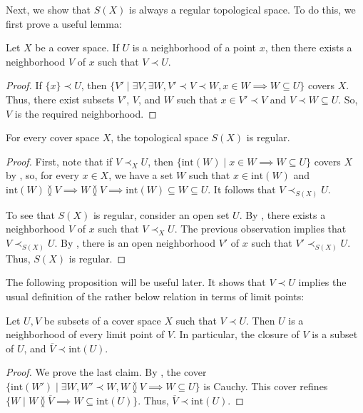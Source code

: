 \documentclass[reqno]{amsart}
\theoremstyle{definition}
\theoremstyle{remark}
\numberwithin{figure}{section}
\newcommand{\overlap}[2]{#1 \between #2}
\newcommand{\rb}{\prec}
\begin{document}
Next, we show that $S(X)$ is always a regular topological space.
To do this, we first prove a useful lemma:

\begin{lem}[rb-point]
Let $X$ be a cover space.
If $U$ is a neighborhood of a point $x$, then there exists a neighborhood $V$ of $x$ such that $V \rb U$.
\end{lem}
\begin{proof}
If $\{ x \} \rb U$, then $\{ V' \mid \exists V, \exists W, V' \rb V \rb W, x \in W \implies W \subseteq U \}$ covers $X$.
Thus, there exist subsets $V'$, $V$, and $W$ such that $x \in V' \rb V$ and $V \rb W \subseteq U$.
So, $V$ is the required neighborhood.
\end{proof}

\begin{prop}
For every cover space $X$, the topological space $S(X)$ is regular.
\end{prop}
\begin{proof}
First, note that if $V \rb_X U$, then $\{ \mathrm{int}(W) \mid x \in W \implies W \subseteq U \}$ covers $X$ by ,
so, for every $x \in X$, we have a set $W$ such that $x \in \mathrm{int}(W)$ and $\overlap{\mathrm{int}(W)}{V} \implies \overlap{W}{V} \implies \mathrm{int}(W) \subseteq W \subseteq U$.
It follows that $V \rb_{S(X)} U$.

To see that $S(X)$ is regular, consider an open set $U$.
By , there exists a neighborhood $V$ of $x$ such that $V \rb_X U$.
The previous observation implies that $V \rb_{S(X)} U$.
By , there is an open neighborhood $V'$ of $x$ such that $V' \rb_{S(X)} U$.
Thus, $S(X)$ is regular.
\end{proof}

The following proposition will be useful later.
It shows that $V \rb U$ implies the usual definition of the rather below relation in terms of limit points:

\begin{prop}[rb-closure]
Let $U,V$ be subsets of a cover space $X$ such that $V \rb U$.
Then $U$ is a neighborhood of every limit point of $V$.
In particular, the closure of $V$ is a subset of $U$, and $\overline{V} \rb \mathrm{int}(U)$.
\end{prop}
\begin{proof}
We prove the last claim.
By , the cover $\{ \mathrm{int}(W') \mid \exists W, W' \rb W, \overlap{W}{V} \implies W \subseteq U \}$ is Cauchy.
This cover refines $\{ W \mid \overlap{W}{\overline{V}} \implies W \subseteq \mathrm{int}(U) \}$.
Thus, $\overline{V} \rb \mathrm{int}(U)$.
\end{proof}
\end{document}
